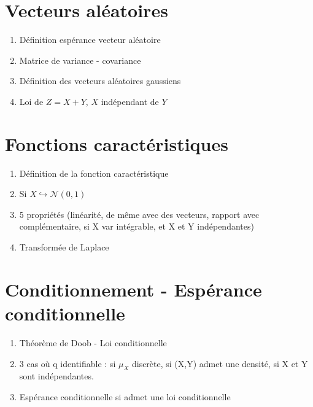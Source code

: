 \documentclass{article}
\begin{document}
\section{Vecteurs aléatoires}
\begin{enumerate}
\item Définition espérance vecteur aléatoire
\item Matrice de variance - covariance
\item Définition des vecteurs aléatoires gaussiens
\item Loi de $Z=X+Y$, $X$ indépendant de $Y$
\end{enumerate}
\section{Fonctions caractéristiques}
\begin{enumerate}
\item Définition de la fonction caractéristique
\item Si $X\hookrightarrow \mathcal{N}(0,1)$
\item 5 propriétés (linéarité, de même avec des vecteurs, rapport avec complémentaire, si X var intégrable, et X et Y indépendantes)
\item Transformée de Laplace
\end{enumerate}
\section{Conditionnement - Espérance conditionnelle}
\begin{enumerate}
\item Théorème de Doob - Loi conditionnelle
\item 3 cas où q identifiable : si $\mu_X$ discrète, si (X,Y) admet une densité, si X et Y sont indépendantes.
\item Espérance conditionnelle si admet une loi conditionnelle
\end{enumerate}
\end{document}
